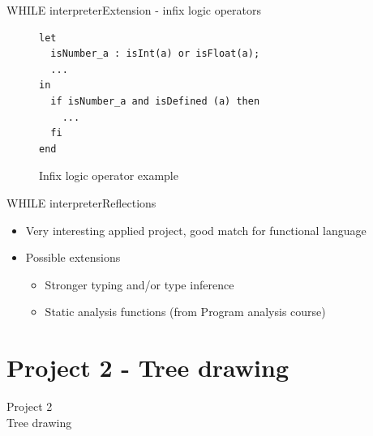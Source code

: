 \documentclass{beamer}
\begin{document}


\begin{frame}[fragile]{WHILE interpreter}{Extension - infix logic operators}
\begin{figure}
\begin{lstlisting}
let
  isNumber_a : isInt(a) or isFloat(a);
  ...
in
  if isNumber_a and isDefined (a) then
    ...
  fi
end
\end{lstlisting}
\caption{Infix logic operator example}
\end{figure}
\end{frame}

\begin{frame}{WHILE interpreter}{Reflections}
  \begin{itemize}
  \item {
    Very interesting applied project, good match for functional language
  }
  \item {
    Possible extensions
  }
  \begin{itemize}
    \item Stronger typing and/or type inference
    \item Static analysis functions (from Program analysis course)
    \end{itemize}
  \end{itemize}
\end{frame}

\section{Project 2 - Tree drawing}
\begin{frame}[plain,c]
\begin{center}
\Huge Project 2\\
\vspace{5mm}
\Large Tree drawing
\end{center}
\end{frame}
\end{document}
